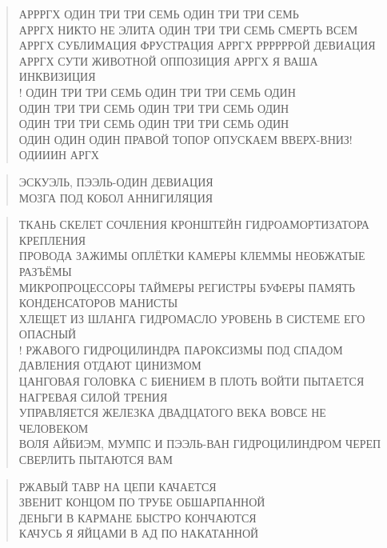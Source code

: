 \begin{verse}
АРРРГХ ОДИН ТРИ ТРИ СЕМЬ ОДИН ТРИ ТРИ СЕМЬ\\
АРРГХ НИКТО НЕ ЭЛИТА ОДИН ТРИ ТРИ СЕМЬ СМЕРТЬ ВСЕМ\\
АРРГХ СУБЛИМАЦИЯ ФРУСТРАЦИЯ АРРГХ РРРРРРОЙ ДЕВИАЦИЯ\\
АРРГХ СУТИ ЖИВОТНОЙ ОППОЗИЦИЯ АРРГХ Я ВАША ИНКВИЗИЦИЯ\\!
ОДИН ТРИ ТРИ СЕМЬ ОДИН ТРИ ТРИ СЕМЬ ОДИН\\
ОДИН ТРИ ТРИ СЕМЬ ОДИН ТРИ ТРИ СЕМЬ ОДИН\\
ОДИН ТРИ ТРИ СЕМЬ ОДИН ТРИ ТРИ СЕМЬ ОДИН\\
ОДИН ОДИН ОДИН ПРАВОЙ ТОПОР ОПУСКАЕМ ВВЕРХ-ВНИЗ! ОДИИИН АРГХ
\end{verse}

\poemtitle{***}
\begin{verse}
ЭСКУЭЛЬ, ПЭЭЛЬ-ОДИН ДЕВИАЦИЯ \\
МОЗГА ПОД КОБОЛ АННИГИЛЯЦИЯ
\end{verse}

\poemtitle{***}
\begin{verse}
ТКАНЬ СКЕЛЕТ СОЧЛЕНИЯ КРОНШТЕЙН ГИДРОАМОРТИЗАТОРА КРЕПЛЕНИЯ\\
ПРОВОДА ЗАЖИМЫ ОПЛЁТКИ КАМЕРЫ КЛЕММЫ НЕОБЖАТЫЕ РАЗЪЁМЫ\\
МИКРОПРОЦЕССОРЫ ТАЙМЕРЫ РЕГИСТРЫ БУФЕРЫ ПАМЯТЬ КОНДЕНСАТОРОВ МАНИСТЫ\\
ХЛЕЩЕТ ИЗ ШЛАНГА ГИДРОМАСЛО УРОВЕНЬ В СИСТЕМЕ ЕГО ОПАСНЫЙ\\!
РЖАВОГО ГИДРОЦИЛИНДРА ПАРОКСИЗМЫ ПОД СПАДОМ ДАВЛЕНИЯ ОТДАЮТ ЦИНИЗМОМ\\
ЦАНГОВАЯ ГОЛОВКА С БИЕНИЕМ В ПЛОТЬ ВОЙТИ ПЫТАЕТСЯ НАГРЕВАЯ СИЛОЙ ТРЕНИЯ\\
УПРАВЛЯЕТСЯ ЖЕЛЕЗКА ДВАДЦАТОГО ВЕКА ВОВСЕ НЕ ЧЕЛОВЕКОМ\\
ВОЛЯ АЙБИЭМ, МУМПС И ПЭЭЛЬ-ВАН ГИДРОЦИЛИНДРОМ ЧЕРЕП СВЕРЛИТЬ ПЫТАЮТСЯ ВАМ
\end{verse}

\poemtitle{***}
\begin{verse}
РЖАВЫЙ ТАВР НА ЦЕПИ КАЧАЕТСЯ\\
ЗВЕНИТ КОНЦОМ ПО ТРУБЕ ОБШАРПАННОЙ\\
ДЕНЬГИ В КАРМАНЕ БЫСТРО КОНЧАЮТСЯ\\
КАЧУСЬ Я ЯЙЦАМИ В АД ПО НАКАТАННОЙ
\end{verse}

